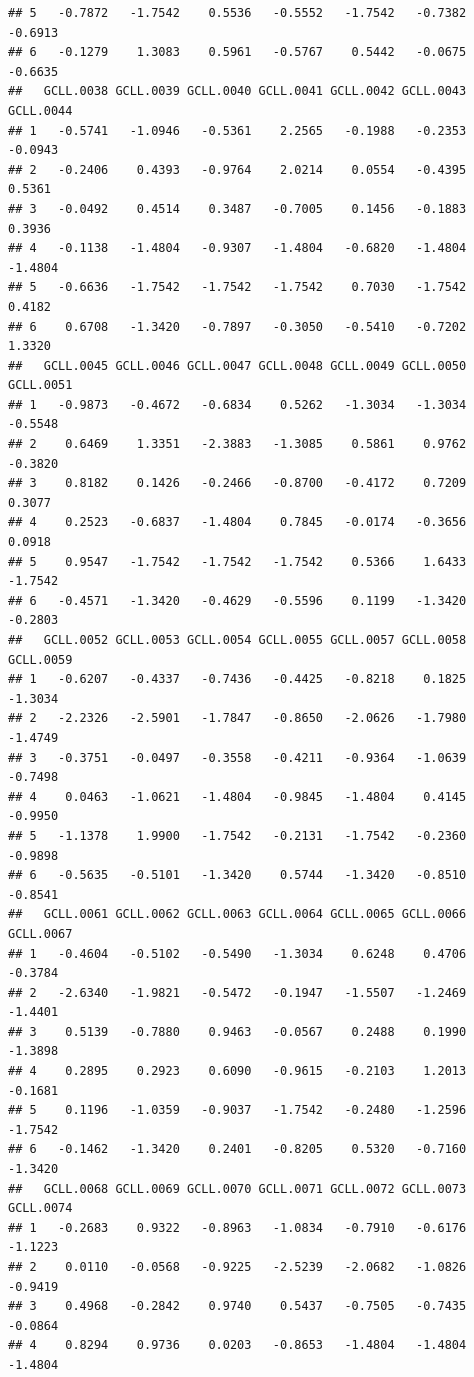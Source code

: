 \documentclass[
]{article}
\begin{document}
\begin{verbatim}
## 5   -0.7872   -1.7542    0.5536   -0.5552   -1.7542   -0.7382   -0.6913
## 6   -0.1279    1.3083    0.5961   -0.5767    0.5442   -0.0675   -0.6635
##   GCLL.0038 GCLL.0039 GCLL.0040 GCLL.0041 GCLL.0042 GCLL.0043 GCLL.0044
## 1   -0.5741   -1.0946   -0.5361    2.2565   -0.1988   -0.2353   -0.0943
## 2   -0.2406    0.4393   -0.9764    2.0214    0.0554   -0.4395    0.5361
## 3   -0.0492    0.4514    0.3487   -0.7005    0.1456   -0.1883    0.3936
## 4   -0.1138   -1.4804   -0.9307   -1.4804   -0.6820   -1.4804   -1.4804
## 5   -0.6636   -1.7542   -1.7542   -1.7542    0.7030   -1.7542    0.4182
## 6    0.6708   -1.3420   -0.7897   -0.3050   -0.5410   -0.7202    1.3320
##   GCLL.0045 GCLL.0046 GCLL.0047 GCLL.0048 GCLL.0049 GCLL.0050 GCLL.0051
## 1   -0.9873   -0.4672   -0.6834    0.5262   -1.3034   -1.3034   -0.5548
## 2    0.6469    1.3351   -2.3883   -1.3085    0.5861    0.9762   -0.3820
## 3    0.8182    0.1426   -0.2466   -0.8700   -0.4172    0.7209    0.3077
## 4    0.2523   -0.6837   -1.4804    0.7845   -0.0174   -0.3656    0.0918
## 5    0.9547   -1.7542   -1.7542   -1.7542    0.5366    1.6433   -1.7542
## 6   -0.4571   -1.3420   -0.4629   -0.5596    0.1199   -1.3420   -0.2803
##   GCLL.0052 GCLL.0053 GCLL.0054 GCLL.0055 GCLL.0057 GCLL.0058 GCLL.0059
## 1   -0.6207   -0.4337   -0.7436   -0.4425   -0.8218    0.1825   -1.3034
## 2   -2.2326   -2.5901   -1.7847   -0.8650   -2.0626   -1.7980   -1.4749
## 3   -0.3751   -0.0497   -0.3558   -0.4211   -0.9364   -1.0639   -0.7498
## 4    0.0463   -1.0621   -1.4804   -0.9845   -1.4804    0.4145   -0.9950
## 5   -1.1378    1.9900   -1.7542   -0.2131   -1.7542   -0.2360   -0.9898
## 6   -0.5635   -0.5101   -1.3420    0.5744   -1.3420   -0.8510   -0.8541
##   GCLL.0061 GCLL.0062 GCLL.0063 GCLL.0064 GCLL.0065 GCLL.0066 GCLL.0067
## 1   -0.4604   -0.5102   -0.5490   -1.3034    0.6248    0.4706   -0.3784
## 2   -2.6340   -1.9821   -0.5472   -0.1947   -1.5507   -1.2469   -1.4401
## 3    0.5139   -0.7880    0.9463   -0.0567    0.2488    0.1990   -1.3898
## 4    0.2895    0.2923    0.6090   -0.9615   -0.2103    1.2013   -0.1681
## 5    0.1196   -1.0359   -0.9037   -1.7542   -0.2480   -1.2596   -1.7542
## 6   -0.1462   -1.3420    0.2401   -0.8205    0.5320   -0.7160   -1.3420
##   GCLL.0068 GCLL.0069 GCLL.0070 GCLL.0071 GCLL.0072 GCLL.0073 GCLL.0074
## 1   -0.2683    0.9322   -0.8963   -1.0834   -0.7910   -0.6176   -1.1223
## 2    0.0110   -0.0568   -0.9225   -2.5239   -2.0682   -1.0826   -0.9419
## 3    0.4968   -0.2842    0.9740    0.5437   -0.7505   -0.7435   -0.0864
## 4    0.8294    0.9736    0.0203   -0.8653   -1.4804   -1.4804   -1.4804

\end{verbatim}
\end{document}
